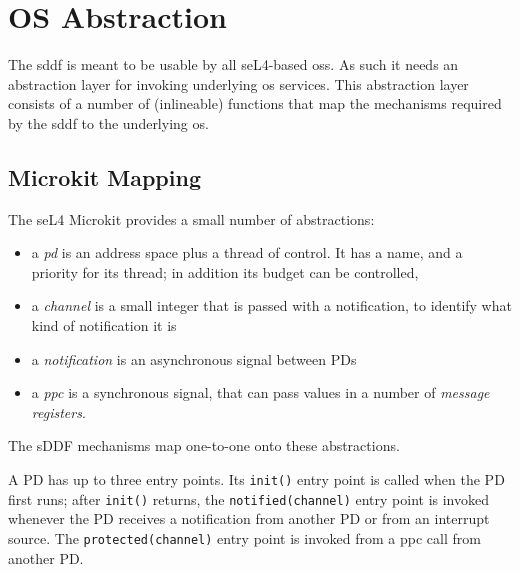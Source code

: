 \documentclass[a4paper,12pt]{report}
\begin{document}
\chapter{OS Abstraction}\label{s:osal}

The \gls{sddf} is meant to be usable by all seL4-based \glspl{os}. As
such it needs an abstraction layer for invoking underlying \gls{os}
services. This abstraction layer consists of a number of (inlineable)
functions that map the mechanisms required by the \gls{sddf} to the
underlying \gls{os}.

\section{Microkit Mapping}\label{s:mkal}

The seL4 Microkit provides a small number of abstractions:
\begin{itemize}
\item a \emph{\gls{pd}} is an address space plus a thread of control.  It has
  a name, and a priority for its thread; in addition its budget can be
  controlled,
\item a \emph{channel} is a small integer that is passed with a
  notification, to identify what kind of notification it is
\item a \emph{notification} is an asynchronous signal between PDs
\item a \emph{\gls{ppc}} is a synchronous signal, that can pass values
  in a number of \emph{message registers}.
\end{itemize}

The sDDF mechanisms map one-to-one onto these abstractions.

A PD has up to three entry points.  Its \texttt{init()} entry point is
called when the PD first runs; after \texttt{init()} returns, the
\texttt{notified(channel)} entry point is invoked whenever the PD
receives a notification from another PD or from an interrupt source.
The \texttt{protected(channel)} entry point is invoked from a
\gls{ppc} call from another PD.
\end{document}
